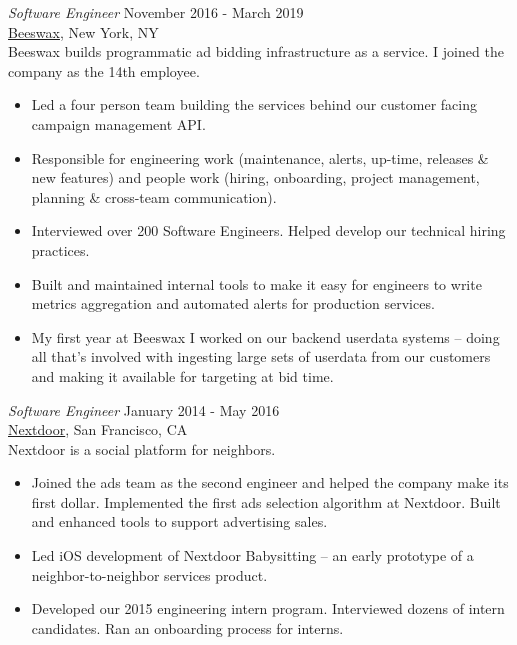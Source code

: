 \documentclass[margin, 10pt]{res}
\begin{document}
\begin{resume}
\begin{flushleft}
{\sl Software Engineer} \hfill November 2016 - March 2019 \\
\href{http://www.beeswax.com}{Beeswax}, New York, NY \\
Beeswax builds programmatic ad bidding infrastructure as a service. I joined the company as the 14th employee.
\begin{itemize} \itemsep -1pt %
\item Led a four person team building the services behind our customer facing campaign management API.
\item Responsible for engineering work (maintenance, alerts, up-time, releases \& new features) and people work (hiring, onboarding, project management, planning \& cross-team communication).
\item Interviewed over 200 Software Engineers. Helped develop our technical hiring practices.
\item Built and maintained internal tools to make it easy for engineers to write metrics aggregation and automated alerts for production services.
\item My first year at Beeswax I worked on our backend userdata systems -- doing all that's involved with ingesting large sets of userdata from our customers and making it available for targeting at bid time.
\end{itemize}

{\sl Software Engineer} \hfill January 2014 - May 2016 \\
\href{http://www.nextdoor.com}{Nextdoor}, San Francisco, CA \\
Nextdoor is a social platform for neighbors.
\begin{itemize} \itemsep -1pt %

\item Joined the ads team as the second engineer and helped the company make its first dollar. Implemented the first ads selection algorithm at Nextdoor. Built and enhanced tools to support advertising sales.
\item Led iOS development of Nextdoor Babysitting -- an early prototype of a neighbor-to-neighbor services product.
\item Developed our 2015 engineering intern program. Interviewed dozens of intern candidates. Ran an onboarding process for interns.
\end{itemize}



\end{flushleft}
\end{resume}
\end{document}
